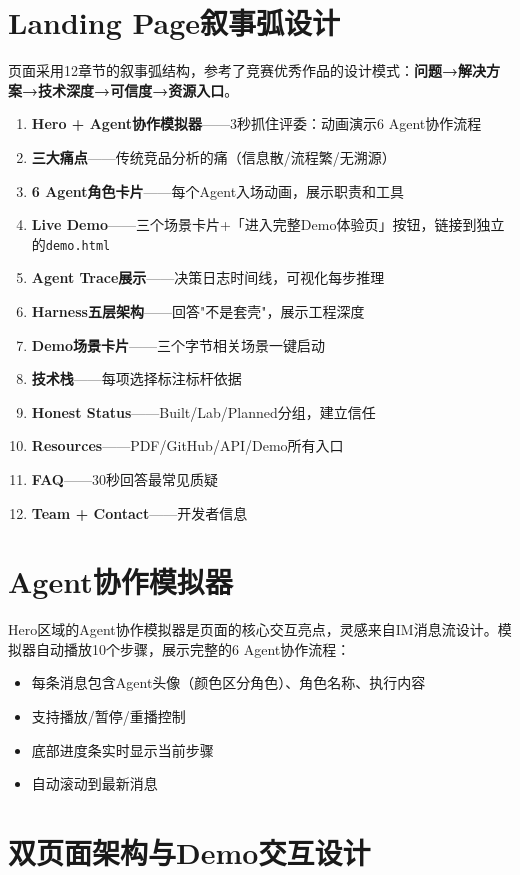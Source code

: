 \documentclass[12pt,a4paper]{ctexrep}
\begin{document}
\section{Landing Page叙事弧设计}

页面采用12章节的叙事弧结构，参考了竞赛优秀作品的设计模式：\textbf{问题→解决方案→技术深度→可信度→资源入口}。

\begin{enumerate}
\item \textbf{Hero + Agent协作模拟器}——3秒抓住评委：动画演示6 Agent协作流程
\item \textbf{三大痛点}——传统竞品分析的痛（信息散/流程繁/无溯源）
\item \textbf{6 Agent角色卡片}——每个Agent入场动画，展示职责和工具
\item \textbf{Live Demo}——三个场景卡片+「进入完整Demo体验页」按钮，链接到独立的\texttt{demo.html}
\item \textbf{Agent Trace展示}——决策日志时间线，可视化每步推理
\item \textbf{Harness五层架构}——回答"不是套壳"，展示工程深度
\item \textbf{Demo场景卡片}——三个字节相关场景一键启动
\item \textbf{技术栈}——每项选择标注标杆依据
\item \textbf{Honest Status}——Built/Lab/Planned分组，建立信任
\item \textbf{Resources}——PDF/GitHub/API/Demo所有入口
\item \textbf{FAQ}——30秒回答最常见质疑
\item \textbf{Team + Contact}——开发者信息
\end{enumerate}

\section{Agent协作模拟器}

Hero区域的Agent协作模拟器是页面的核心交互亮点，灵感来自IM消息流设计。模拟器自动播放10个步骤，展示完整的6 Agent协作流程：

\begin{itemize}
\item 每条消息包含Agent头像（颜色区分角色）、角色名称、执行内容
\item 支持播放/暂停/重播控制
\item 底部进度条实时显示当前步骤
\item 自动滚动到最新消息
\end{itemize}

\section{双页面架构与Demo交互设计}
\end{document}
